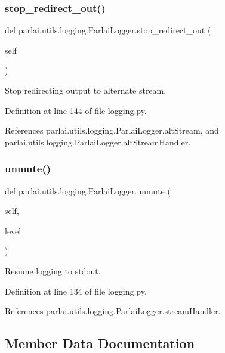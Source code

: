 \subsubsection{\texorpdfstring{stop\+\_\+redirect\+\_\+out()}{stop\_redirect\_out()}}
{\footnotesize\ttfamily def parlai.\+utils.\+logging.\+Parlai\+Logger.\+stop\+\_\+redirect\+\_\+out (\begin{DoxyParamCaption}\item[{}]{self }\end{DoxyParamCaption})}

\begin{DoxyVerb}Stop redirecting output to alternate stream.\end{DoxyVerb}
 

Definition at line 144 of file logging.\+py.



References parlai.\+utils.\+logging.\+Parlai\+Logger.\+alt\+Stream, and parlai.\+utils.\+logging.\+Parlai\+Logger.\+alt\+Stream\+Handler.

\mbox{\label{classparlai_1_1utils_1_1logging_1_1ParlaiLogger_ad00121b486f8553c45d9ab13e81567ab}} 
\subsubsection{\texorpdfstring{unmute()}{unmute()}}
{\footnotesize\ttfamily def parlai.\+utils.\+logging.\+Parlai\+Logger.\+unmute (\begin{DoxyParamCaption}\item[{}]{self,  }\item[{}]{level }\end{DoxyParamCaption})}

\begin{DoxyVerb}Resume logging to stdout.\end{DoxyVerb}
 

Definition at line 134 of file logging.\+py.



References parlai.\+utils.\+logging.\+Parlai\+Logger.\+stream\+Handler.



\subsection{Member Data Documentation}
\mbox{\label{classparlai_1_1utils_1_1logging_1_1ParlaiLogger_a5b1bdad4c97a74ea4e38f678ae0edd2c}} 
